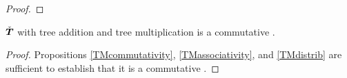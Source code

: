\begin{proposition}
\begin{proof}

\end{proof}
\end{proposition}


\begin{corollary}\label{ItsARingHarry}
$\check{\boldsymbol{T}}$ with tree addition and tree multiplication is a commutative \rng.
\begin{proof}
  Propositions \ref{TMcommutativity}, \ref{TMassociativity}, and
  \ref{TMdistrib} are sufficient to establish that it is a commutative
  \rng.
\end{proof}
\end{corollary}











